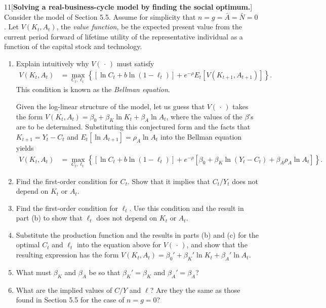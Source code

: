 \begin{problem}{11}[\textbf{Solving a real-business-cycle model by finding the social optimum.}]
Consider the model of Section 5.5. Assume for simplicity that \(n=g=\bar{A}=\bar{N}=0\). Let \(V\left(K_t,A_t\right)\), the \emph{value function}, be the expected present value from the current period forward of lifetime utility of the representative individual as a function of the capital stock and technology.
\begin{enumerate}[label=(\alph*)]
    \item Explain intuitively why \(V\left(\,\cdot\,\right)\) must satisfy
    \begin{align*}
        V\left(K_t,A_t\right)
        &=
        \max_{C_t,\ell_t}
        \left\{
        \left[\ln C_t+b\ln\left(1-\ell_t\right)\right]
        +e^{-\rho}E_t\left[V\left(K_{t+1},A_{t+1}\right)\right]
        \right\}.
    \end{align*}
    This condition is known as the \emph{Bellman equation}.

    Given the log-linear structure of the model, let us guess that \(V\left(\,\cdot\,\right)\) takes the form \(V\left(K_t,A_t\right)=\beta_0+\beta_K\ln K_t+\beta_A\ln A_t\), where the values of the \(\beta\)'s are to be determined. Substituting this conjectured form and the facts that \(K_{t+1}=Y_t-C_t\) and \(E_t\left[\ln A_{t+1}\right]=\rho_A\ln A_t\) into the Bellman equation yields
    \begin{align*}
        V\left(K_t,A_t\right)
        &=
        \max_{C_t,\ell_t}
        \left\{
        \left[\ln C_t+b\ln\left(1-\ell_t\right)\right]
        +e^{-\rho}
        \left[
        \beta_0+\beta_K\ln\left(Y_t-C_t\right)+\beta_A\rho_A\ln A_t
        \right]
        \right\}.
    \end{align*}
    \item Find the first-order condition for \(C_t\). Show that it implies that \(C_t/Y_t\) does not depend on \(K_t\) or \(A_t\).
    \item Find the first-order condition for \(\ell_t\). Use this condition and the result in part (b) to show that \(\ell_t\) does not depend on \(K_t\) or \(A_t\).
    \item Substitute the production function and the results in parts (b) and (c) for the optimal \(C_t\) and \(\ell_t\) into the equation above for \(V\left(\,\cdot\,\right)\), and show that the resulting expression has the form \(V\left(K_t,A_t\right)=\beta_0'+\beta_K'\ln K_t+\beta_A'\ln A_t\).
    \item What must \(\beta_K\) and \(\beta_A\) be so that \(\beta_K'=\beta_K\) and \(\beta_A'=\beta_A\)?
    \item What are the implied values of \(C/Y\) and \(\ell\)? Are they the same as those found in Section 5.5 for the case of \(n=g=0\)?
\end{enumerate}
\end{problem}

